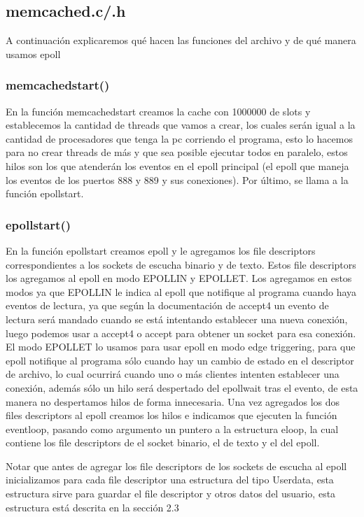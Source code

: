 \documentclass{article}
\begin{document}
\subsection{memcached.c/.h}

A continuación explicaremos qué hacen las funciones del
archivo y de qué manera usamos epoll

\subsubsection{memcached\textunderscore start()}
En la función memcached\textunderscore start creamos la cache con
1000000 de slots y establecemos la cantidad de threads
que vamos a crear, los cuales serán igual a la cantidad de
procesadores que tenga la pc corriendo el programa, esto
lo hacemos para no crear threads de más y que sea posible
ejecutar todos en paralelo, estos hilos son los que atenderán
los eventos en el epoll principal (el epoll que maneja
los eventos de los puertos 888 y 889 y sus conexiones).
Por último, se llama a la función epoll\textunderscore start.

\subsubsection{epoll\textunderscore start()}
En la función epoll\textunderscore start creamos epoll y le
agregamos los file descriptors correspondientes a los sockets
de escucha binario y de texto. Estos file descriptors los
agregamos al epoll en modo EPOLLIN y EPOLLET. Los agregamos
en estos modos ya que EPOLLIN le indica al epoll que notifique
al programa cuando haya eventos de lectura, ya que según la
documentación de accept4 un evento de lectura será mandado
cuando se está intentando establecer una nueva conexión, luego
podemos usar a accept4 o accept para obtener un socket para
esa conexión. El modo EPOLLET lo usamos para usar epoll en
modo edge triggering, para que epoll notifique
al programa sólo cuando hay un cambio de estado en el descriptor
de archivo, lo cual ocurrirá cuando uno o más clientes intenten
establecer una conexión, además sólo un hilo será despertado
del epoll\textunderscore wait tras el evento, de esta manera no despertamos
hilos de forma innecesaria. Una vez
agregados los dos files descriptors al epoll creamos los hilos
e indicamos que ejecuten la función eventloop, pasando como
argumento un puntero a la estructura eloop, la cual contiene
los file descriptors de el socket binario, el de texto y el
del epoll.

Notar que antes de agregar los file descriptors de los sockets
de escucha al epoll inicializamos para cada file descriptor
una estructura del tipo User\textunderscore data, esta 
estructura sirve para guardar el file descriptor y otros
datos del usuario, esta estructura está descrita en
la sección 2.3
\end{document}
